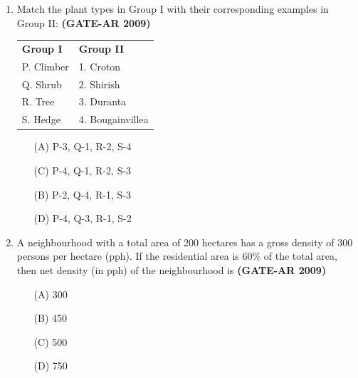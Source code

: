 \documentclass[a4paper,10pt]{article}
\begin{document}
\begin{enumerate}
	\item Match the plant types in Group I with their corresponding examples in Group II: \hfill \textbf{(GATE-AR 2009)} \\
    \begin{tabular}{ p{\dimexpr\columnwidth-2\tabcolsep} p{\dimexpr\columnwidth-2\tabcolsep} }
	\textbf{Group I} & \textbf{Group II} \\
	P. Climber & 1. Croton \\
	Q. Shrub & 2. Shirish \\
	R. Tree & 3. Duranta \\
	S. Hedge & 4. Bougainvillea \\
	\end{tabular}
	\begin{multicols}{2}
	\begin{itemize}
        \item[(A)] P-3, Q-1, R-2, S-4
        \item[(C)] P-4, Q-1, R-2, S-3
        \item[(B)] P-2, Q-4, R-1, S-3
        \item[(D)] P-4, Q-3, R-1, S-2
    \end{itemize}
	\end{multicols}

    \item A neighbourhood with a total area of 200 hectares has a gross density of 300 persons per hectare (pph). If the residential area is 60\% of the total area, then net density (in pph) of the neighbourhood is \hfill \textbf{(GATE-AR 2009)}
    \begin{multicols}{4}
	\begin{itemize}
        \item[(A)] 300
        \item[(B)] 450
        \item[(C)] 500
        \item[(D)] 750
    \end{itemize}
	\end{multicols}


\end{enumerate}
\end{document}
